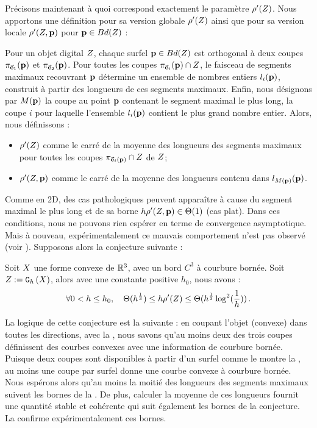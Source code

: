%
Précisons maintenant à quoi correspond exactement le paramètre
$\rho'(Z)$. Nous apportons une définition pour sa version globale
$\rho'(Z)$ ainsi que pour sa version locale $\rho'(Z, \mathbf{p})$ pour
$\mathbf{p} \in Bd({Z})$ :
%
\begin{definition}
  \label{def:rho-dig-3d}
  Pour un objet digital $Z$, chaque surfel $\mathbf{p} \in Bd({Z})$ est
  orthogonal à deux coupes $\pi_{\vec{\mathbf{e}}_1}(\mathbf{p})$ et $\pi_{\vec{\mathbf{e}}_2}(\mathbf{p})$.
  Pour toutes les coupes $\pi_{\vec{\mathbf{e}}_i}(\mathbf{p}) \cap Z$, le faisceau de
  segments maximaux recouvrant $\mathbf{p}$ détermine un ensemble de nombres entiers
  $l_i(\mathbf{p})$, construit à partir des longueurs de ces segments maximaux. Enfin,
  nous désignons par $M(\mathbf{p})$ la coupe au point $\mathbf{p}$ contenant le segment
  maximal le plus long, \cad la coupe $i$ pour laquelle l'ensemble $l_i(\mathbf{p})$
  contient le plus grand nombre entier. Alors, nous définissons :
  \begin{itemize}
    \item $\rho'(Z)$ comme le carré de la moyenne des longueurs des segments maximaux pour toutes les coupes $\pi_{\vec{\mathbf{e}}_i(\mathbf{p})} \cap Z$ de $Z$;
    \item $\rho'(Z, \mathbf{p})$ comme le carré de la moyenne des longueurs contenu dans $l_{M(\mathbf{p})}(\mathbf{p})$.
  \end{itemize}
\end{definition}
%
Comme en 2D, des cas pathologiques peuvent apparaître à cause du segment maximal
le plus long et de sa borne $h\rho'(Z, \mathbf{p}) \in \Theta(1)$ (cas plat).
Dans ces conditions, nous ne pouvons rien espérer en terme de convergence
asymptotique. Mais à nouveau, expérimentalement ce mauvais comportement n'est
pas observé (voir ).
%
Supposons alors la conjecture suivante :
%
\begin{conjecture}
\label{conj:slice-mdss-3d}
  Soit $X$ une forme convexe de $\mathbb{R}^3$, avec un bord $C^3$ à courbure
  bornée. Soit $Z := \mathtt{G}_{h}\left(X\right)$, alors avec une constante positive $h_0$,
  nous avons :
  \begin{equation}
    \forall 0 < h \le h_0,\quad \Theta(h^{\frac{1}{3}}) \le h\rho'(Z) \le \Theta(h^{\frac{1}{3}} \log^2 (\frac{1}{h})) \,.
  \end{equation}
\end{conjecture}
%
La logique de cette conjecture est la suivante : en coupant l'objet (convexe) dans
toutes les directions, avec la , nous savons
qu'au moins deux des trois coupes définissent des courbes convexes avec une
information de courbure bornée. Puisque deux coupes sont disponibles à partir
d'un surfel comme le montre la , au moins une coupe
par surfel donne une courbe convexe à courbure bornée. Nous espérons alors qu'au
moins la moitié des longueurs des segments maximaux suivent les bornes de la
. De plus, calculer la moyenne de ces
longueurs fournit une quantité stable et cohérente qui suit également les bornes
de la conjecture.
La  confirme expérimentalement ces bornes.

